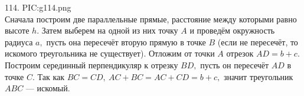 114. {{PIC:g114.png}}\\
Сначала построим две параллельные прямые, расстояние между которыми равно высоте $h.$ Затем выберем на одной из них точку $A$ и проведём окружность радиуса $a,$ пусть она пересечёт вторую прямую в точке $B$ (если не пересечёт, то искомого треугольника не существует). Отложим от точки $A$ отрезок $AD=b+c.$ Построим серединный перпендикуляр к отрезку $BD,$ пусть он пересечёт $AD$ в точке $C.$ Так как $BC=CD,\ AC+BC=AC+CD=b+c,$ значит треугольник $ABC$ --- искомый.\newpage\noindent
